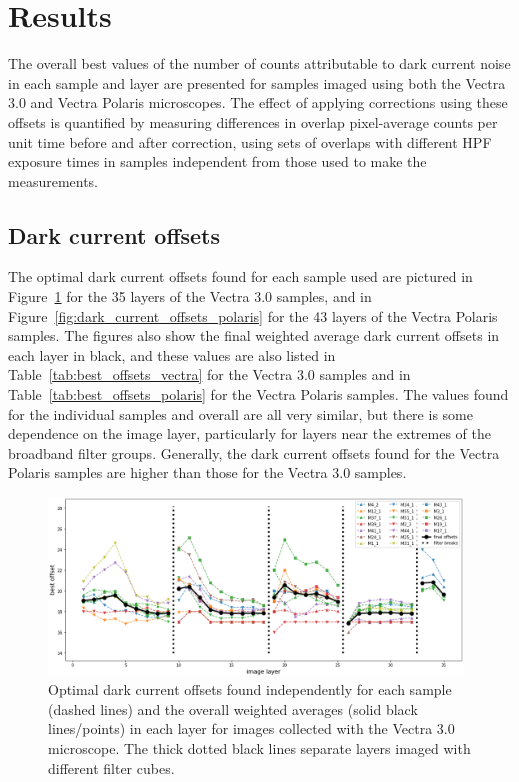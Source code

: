 \documentclass[letterpaper,11pt]{article}
\newcommand{\reffig}[1]{Figure~\ref{#1}}
\newcommand{\reftab}[1]{Table~\ref{#1}}
\begin{document}
\clearpage

\section{Results}
\label{sec:results}

The overall best values of the number of counts attributable to dark current noise in each sample and layer are presented for samples imaged using both the Vectra 3.0 and Vectra Polaris microscopes. The effect of applying corrections using these offsets is quantified by measuring differences in overlap pixel-average counts per unit time before and after correction, using sets of overlaps with different HPF exposure times in samples independent from those used to make the measurements. 

\subsection{Dark current offsets}
\label{ssec:dark_current_offsets}

The optimal dark current offsets found for each sample used are pictured in \reffig{fig:dark_current_offsets_vectra} for the 35 layers of the Vectra 3.0 samples, and in \reffig{fig:dark_current_offsets_polaris} for the 43 layers of the Vectra Polaris samples. The figures also show the final weighted average dark current offsets in each layer in black, and these values are also listed in \reftab{tab:best_offsets_vectra} for the Vectra 3.0 samples and in \reftab{tab:best_offsets_polaris} for the Vectra Polaris samples. The values found for the individual samples and overall are all very similar, but there is some dependence on the image layer, particularly for layers near the extremes of the broadband filter groups. Generally, the dark current offsets found for the Vectra Polaris samples are higher than those for the Vectra 3.0 samples.

\begin{figure}[!ht]
\centering
\includegraphics[width=0.98\textwidth]{images/results/dark_current_offsets_vectra}
\caption{\footnotesize Optimal dark current offsets found independently for each sample (dashed lines) and the overall weighted averages (solid black lines/points) in each layer for images collected with the Vectra 3.0 microscope. The thick dotted black lines separate layers imaged with different filter cubes.}
\label{fig:dark_current_offsets_vectra}
\end{figure}
\end{document}

